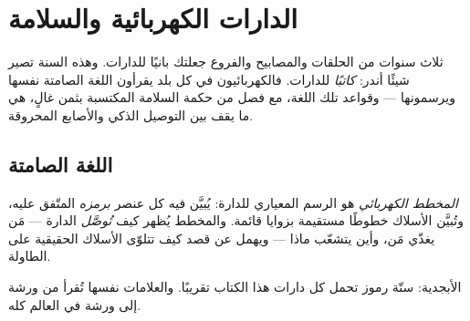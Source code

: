 \chapter{الدارات الكهربائية والسلامة}\label{ch:g6:circuits-and-safety}

ثلاث سنوات من الحلقات والمصابيح والفروع جعلتك بانيًا للدارات.
وهذه السنة تصير شيئًا أندر: \emph{كاتبًا} للدارات. فالكهربائيون
في كل بلد يقرأون اللغة الصامتة نفسها ويرسمونها --- وقواعد تلك
اللغة، مع فصل من حكمة السلامة المكتسبة بثمن غالٍ، هي ما يقف بين
التوصيل الذكي والأصابع المحروقة.

\section{اللغة الصامتة}

\begin{definition}\label{def:g6:circuits-and-safety:diagram}
\emph{المخطط الكهربائي} هو الرسم المعياري
للدارة: يُبيَّن فيه كل عنصر \emph{برمزه} المتّفق
عليه، وتُبيَّن الأسلاك خطوطًا مستقيمة بزوايا قائمة. والمخطط
يُظهر كيف \emph{تُوصَّل} الدارة --- مَن يغذّي مَن، وأين يتشعّب
ماذا --- ويهمل عن قصد كيف تتلوّى الأسلاك الحقيقية على الطاولة.
\end{definition}

\begin{omfigure}

{\small الأبجدية: ستّة رموز تحمل كل دارات هذا الكتاب تقريبًا.
والعلامات نفسها تُقرأ من ورشة إلى ورشة في العالم كله.}
\end{omfigure}

